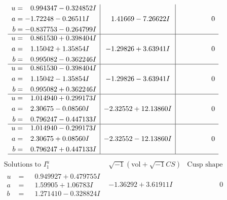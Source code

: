 \documentclass[1p]{elsarticle_modified}
\theoremstyle{definition}
\newcommand{\I}{\sqrt{-1}}
\begin{document}
$$\begin{array}{c|c|c}
\begin{aligned}
u &= \phantom{-}0.994347 - 0.324852 I \\
a &= -1.72248 - 0.26511 I \\
b &= -0.837753 - 0.264799 I\end{aligned}
 & \phantom{-}1.41669 - 7.26622 I & \phantom{-0.000000 } 0 \\ \hline\begin{aligned}
u &= \phantom{-}0.861530 + 0.398404 I \\
a &= \phantom{-}1.15042 + 1.35854 I \\
b &= \phantom{-}0.995082 - 0.362246 I\end{aligned}
 & -1.29826 + 3.63941 I & \phantom{-0.000000 } 0 \\ \hline\begin{aligned}
u &= \phantom{-}0.861530 - 0.398404 I \\
a &= \phantom{-}1.15042 - 1.35854 I \\
b &= \phantom{-}0.995082 + 0.362246 I\end{aligned}
 & -1.29826 - 3.63941 I & \phantom{-0.000000 } 0 \\ \hline\begin{aligned}
u &= \phantom{-}1.014940 + 0.299173 I \\
a &= \phantom{-}2.30675 - 0.08560 I \\
b &= \phantom{-}0.796247 - 0.447133 I\end{aligned}
 & -2.32552 + 12.13860 I & \phantom{-0.000000 } 0 \\ \hline\begin{aligned}
u &= \phantom{-}1.014940 - 0.299173 I \\
a &= \phantom{-}2.30675 + 0.08560 I \\
b &= \phantom{-}0.796247 + 0.447133 I\end{aligned}
 & -2.32552 - 12.13860 I & \phantom{-0.000000 } 0\\
 \hline 
 \end{array}$$\newpage$$\begin{array}{c|c|c}  
\text{Solutions to }I^u_{1}& \I (\text{vol} + \sqrt{-1}CS) & \text{Cusp shape}\\
 \hline 
\begin{aligned}
u &= \phantom{-}0.949927 + 0.479755 I \\
a &= \phantom{-}1.59905 + 1.06783 I \\
b &= \phantom{-}1.271410 - 0.328824 I\end{aligned}
 & -1.36292 + 3.61911 I & \phantom{-0.000000 } 0 \\ \hline\begin{aligned}

\end{aligned}
\end{array}$$
\end{document}
